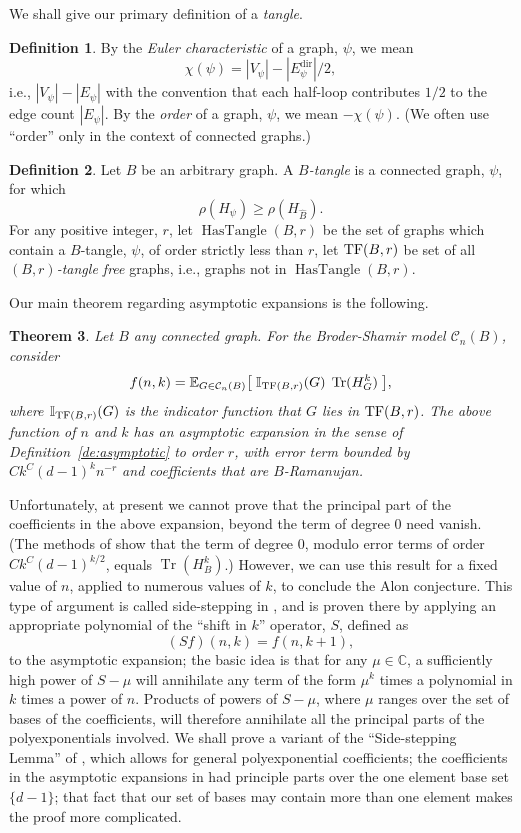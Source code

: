 \documentclass{memo-l}
\newcommand{\TF}{{\rm TF}}
\theoremstyle{plain}
\newtheorem{theorem}{Theorem}[section]
\theoremstyle{definition}
\newtheorem{definition}[theorem]{Definition}
\numberwithin{section}{chapter}
\numberwithin{equation}{chapter}
\newcommand{\complex}{{\mathbb C}}
\newcommand{\expect}[2]{{\mathbb{E}}_{#1}{\left[\; #2\; \right]}}
\DeclareMathOperator{\HasTangle}{HasTangle}
\DeclareMathOperator{\Tr}{Tr}
\newcommand{\Edir}{E^{\mathrm{dir}}}
\theoremstyle{plain}
\theoremstyle{definition}
\newcommand\II{\mathbb{I}}
\newcommand\cC{\mathcal{C}}
\begin{document}
{We shall give our primary definition of a {\em tangle}.

\begin{definition}
By the {\em Euler characteristic} of a graph, $\psi$, we mean
$$
\chi(\psi) = |V_\psi| - |\Edir_\psi|/2,
$$
i.e., $|V_\psi| - |E_\psi|$
with the convention that each half-loop contributes $1/2$ to the
edge count $|E_\psi|$.
By the {\em order} of a graph, $\psi$, we mean $-\chi(\psi)$.
(We often use ``order'' only in the context of connected graphs.)
\end{definition}


\begin{definition}
Let $B$ be an arbitrary graph.
A {\em $B$-tangle} is a connected graph, $\psi$, for which
$$
\rho(H_\psi) \ge \rho(H_{\widehat B}).
$$
For any positive integer, $r$, let 
$\HasTangle(B,r)$ be the set of graphs which contain a $B$-tangle, $\psi$,
of order strictly less than $r$, let
$\TF(B,r)$ be set of all {\em $(B,r)$-tangle free}
graphs, i.e., graphs not in $\HasTangle(B,r)$.
\end{definition}

Our main theorem regarding asymptotic expansions is the following.

\begin{theorem}
\label{th:main_asymptotic}
Let $B$ any connected graph.  For the Broder-Shamir
model $\cC_n(B)$, consider
$$
f(n,k)=\expect{G\in\cC_n(B)}{\II_{\TF(B,r)}(G)\;\Tr(H_G^k) },
$$
where $\II_{\TF(B,r)}(G)$ is the indicator function that
$G$ lies in $\TF(B,r)$.
The above function of $n$ and $k$
has an asymptotic expansion in the sense
of Definition~\ref{de:asymptotic}
to order $r$, with error term bounded by
$Ck^C(d-1)^kn^{-r}$ and coefficients that are $B$-Ramanujan.
\end{theorem}

Unfortunately, at present we cannot prove that
the principal part of the coefficients in the above expansion,
beyond the term of degree $0$ 
need vanish.
(The methods of \cite{friedman_relative} show that 
the term of degree $0$, modulo error terms of order
$Ck^C(d-1)^{k/2}$, equals $\Tr(H_B^k)$.)
However, we can use this result for a fixed value of $n$, applied
to numerous values of $k$, to conclude the Alon conjecture.
This type of argument is called side-stepping in \cite{friedman_alon},
and is proven there by applying an appropriate polynomial
of the ``shift in $k$'' operator, $S$, defined as
$$
(Sf)(n,k) = f(n,k+1),
$$
to the asymptotic expansion; the basic idea is
that for any $\mu\in \complex$, 
a sufficiently high power of $S-\mu$ will annihilate any
term of the form $\mu^k$ times a polynomial in $k$ times a power of $n$.
Products of powers of $S-\mu$, where $\mu$ ranges over the 
set of bases of the coefficients, will therefore annihilate all the
principal parts of the polyexponentials involved.
We
shall prove a variant of the ``Side-stepping Lemma''
of \cite{friedman_alon}, which allows for general polyexponential
coefficients; the coefficients in the asymptotic expansions 
in \cite{friedman_alon} had principle parts over the one element
base set $\{d-1\}$; that fact that our set of bases may contain more
than one element makes the proof more complicated.

}
\end{document}

